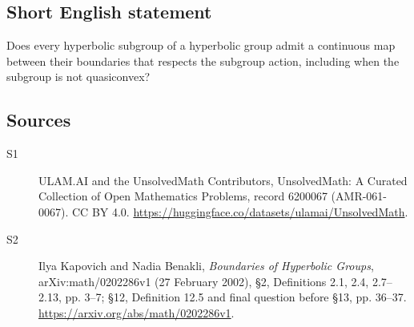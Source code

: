 \documentclass[11pt]{article}
\begin{document}
\subsection{Short English statement}
Does every hyperbolic subgroup of a hyperbolic group admit a continuous map between their boundaries that respects the subgroup action, including when the subgroup is not quasiconvex?
\subsection{Sources}
\begin{description}
\item[\hypertarget{source:6200067:1}{S1}] ULAM.AI and the UnsolvedMath Contributors, UnsolvedMath: A Curated Collection of Open Mathematics Problems, record 6200067 (AMR-061-0067). CC BY 4.0. \url{https://huggingface.co/datasets/ulamai/UnsolvedMath}.
\item[\hypertarget{source:6200067:2}{S2}] Ilya Kapovich and Nadia Benakli, \emph{Boundaries of Hyperbolic Groups}, arXiv:math/0202286v1 (27 February 2002), \S2, Definitions 2.1, 2.4, 2.7--2.13, pp. 3--7; \S12, Definition 12.5 and final question before \S13, pp. 36--37. \url{https://arxiv.org/abs/math/0202286v1}.
\end{description}
\label{end:6200067}
\end{document}
